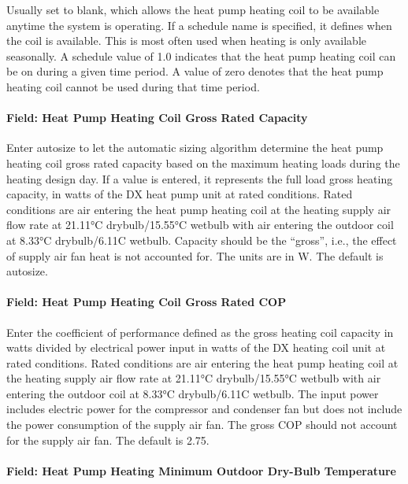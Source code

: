 Usually set to blank, which allows the heat pump heating coil to be available anytime the system is operating. If a schedule name is specified, it defines when the coil is available. This is most often used when heating is only available seasonally. A schedule value of 1.0 indicates that the heat pump heating coil can be on during a given time period. A value of zero denotes that the heat pump heating coil cannot be used during that time period.

\paragraph{Field: Heat Pump Heating Coil Gross Rated Capacity}\label{field-heat-pump-heating-coil-gross-rated-capacity}

Enter autosize to let the automatic sizing algorithm determine the heat pump heating coil gross rated capacity based on the maximum heating loads during the heating design day. If a value is entered, it represents the full load gross heating capacity, in watts of the DX heat pump unit at rated conditions. Rated conditions are air entering the heat pump heating coil at the heating supply air flow rate at 21.11°C drybulb/15.55°C wetbulb with air entering the outdoor coil at 8.33°C drybulb/6.11C wetbulb. Capacity should be the ``gross'', i.e., the effect of supply air fan heat is not accounted for. The units are in W. The default is autosize.

\paragraph{Field: Heat Pump Heating Coil Gross Rated COP}\label{field-heat-pump-heating-coil-gross-rated-cop}

Enter the coefficient of performance defined as the gross heating coil capacity in watts divided by electrical power input in watts of the DX heating coil unit at rated conditions. Rated conditions are air entering the heat pump heating coil at the heating supply air flow rate at 21.11°C drybulb/15.55°C wetbulb with air entering the outdoor coil at 8.33°C drybulb/6.11C wetbulb. The input power includes electric power for the compressor and condenser fan but does not include the power consumption of the supply air fan. The gross COP should not account for the supply air fan. The default is 2.75.

\paragraph{Field: Heat Pump Heating Minimum Outdoor Dry-Bulb Temperature}\label{field-heat-pump-heating-minimum-outdoor-dry-bulb-temperature}

